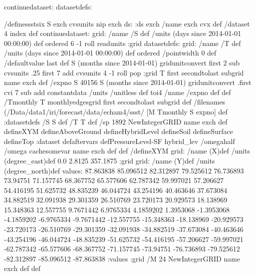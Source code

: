 \begin{ingrid}
continuedataset:
datasetdefs:
\end{ingrid}
\begin{ingrid}
/definessstsix {
S exch cvsunits nip
exch
ds: :ds
exch /name exch cvx def
/dataset 4 index def
continuedataset:
grid: /name /S def /units (days since 2014-01-01 00:00:00) def ordered 
6 -1 roll 
readunits :grid
datasetdefs:
grid: /name /T def /units (days since 2014-01-01 00:00:00) def ordered
/pointwidth 0 def
/defaultvalue {last} def
S (months since 2014-01-01) gridunitconvert
first 2 sub cvsunits .25
first 7 add cvsunits
4 -1 roll pop
:grid
T first secondtolast subgrid name exch def
/expno 
S
40156 S (months since 2014-01-01) gridunitconvert .first cvi 7 sub add 
constantdata /units /unitless def toi4
/name /expno def
def
/Tmonthly T monthlyedgesgrid first secondtolast subgrid def
/filenames {
(/Data/data1/iri/forecast/data/echam4/ssst/%
[M Tmonthly S expno]} def
:datasetdefs
/S S def
/T T def
/sp 1892 NewIntegerGRID name exch def
defineXYM
defineAboveGround
defineHybridLevel
defineSoil
defineSurface
defineTop
:dataset
defaftervars
defPressureLevel-SF 
hybrid_lev /omegahalf /omega cachesomevar
name exch def
} def
/defineXYM {
grid:
/name (X)def
/units (degree_east)def
 0.0 2.8125 357.1875
:grid
grid:
/name (Y)def
/units (degree_north)def
values: 87.863838 85.096512 82.312897 79.525612 76.736893 73.94751 71.157745 68.367752 65.577606 62.787342 59.997021 57.206627 54.416195 51.625732 48.835239 46.044724 43.254196 40.463646 37.673084 34.882519 32.091938 29.301359 26.510769 23.720173 20.929573 18.138969 15.348363 12.557755 9.7671442 6.9765334 4.1859202 1.3953068 -1.3953068 -4.1859202 -6.9765334 -9.7671442 -12.557755 -15.348363 -18.138969 -20.929573 -23.720173 -26.510769 -29.301359 -32.091938 -34.882519 -37.673084 -40.463646 -43.254196 -46.044724 -48.835239 -51.625732 -54.416195 -57.206627 -59.997021 -62.787342 -65.577606 -68.367752 -71.157745 -73.94751 -76.736893 -79.525612 -82.312897 -85.096512 -87.863838 :values
:grid
/M 24 NewIntegerGRID name exch def
} def
\end{ingrid}
